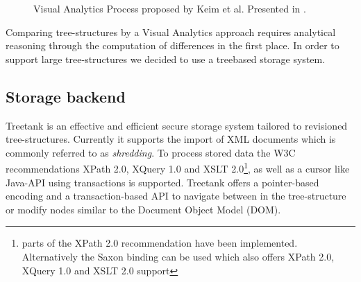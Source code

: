 \begin{figure}[htb]
\caption{\label{fig:visualanalyticsprocess} Visual Analytics Process proposed by Keim et al. Presented in \cite{keim2008visual}.}
\end{figure}


Comparing tree-structures by a Visual Analytics approach requires analytical reasoning through the computation of differences in the first place. In order to support large tree-structures we decided to use a treebased storage system.

\subsection{Storage backend}
Treetank\cite{TREETANK} is an effective and efficient secure storage system tailored to revisioned tree-structures. Currently it supports the import of XML documents which is commonly referred to as \emph{shredding}. To process stored data the W3C recommendations XPath 2.0, XQuery 1.0 and XSLT 2.0\footnote{parts of the XPath 2.0 recommendation have been implemented. Alternatively the Saxon binding can be used which also offers XPath 2.0, XQuery 1.0 and XSLT 2.0 support}, as well as a cursor like Java-API using transactions is supported. Treetank offers a pointer-based encoding and a transaction-based API to navigate between in the tree-structure or modify nodes similar to the Document Object Model (DOM\cite{DOM}).

